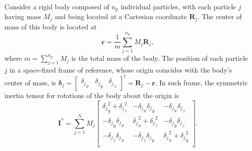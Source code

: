 \documentclass[aip,jcp,reprint,amsmath,amssymb,raggedbottom]{revtex4-1}
\newcommand{\mt}[1]{\boldsymbol{\mathbf{#1}}}           %
\newcommand{\vt}[1]{\boldsymbol{\mathbf{#1}}}           %
\newcommand{\tr}[1]{#1^t}                               %
\begin{document}
Consider a rigid body composed of $n_p$ individual particles, with each particle $j$ having mass $M_j$ and being located at a Cartesian coordinate $\vt R_j$. The center of mass of this body is located at
\[
\vt r = \frac{1}{m}\sum_{j=1}^{n_p} M_j {\vt R}_j,
\]
where $m = \sum_{j=1}^{n_p} M_j$ is the total mass of the body. The position of each particle $j$ in a space-fixed frame of reference, whose origin coincides with the body's center of mass, is ${\vt \delta}_j = \tr{ [\begin{array}{ccc} {\delta_j}_x & {\delta_j}_y & {\delta_j}_z \end{array}]} = {\vt R}_j - {\vt r}$. In such frame, the symmetric inertia tensor for rotations of the body about the origin is\cite{Goldstein2002}
\[
{\mt I}^\ast = \sum_{j=1}^N M_j \left[ \begin{array}{ccc}
{\delta_j}_y^2 + {\delta_j}_z^2 & -{\delta_j}_x {\delta_j}_y & -{\delta_j}_x {\delta_j}_z \\
-{\delta_j}_y {\delta_j}_x & {\delta_j}_x^2 + {\delta_j}_z^2 & -{\delta_j}_y {\delta_j}_z \\
-{\delta_j}_z {\delta_j}_x & -{\delta_j}_z {\delta_j}_y & {\delta_j}_x^2 + {\delta_j}_y^2 \\
\end{array} \right].
\]
\end{document}
